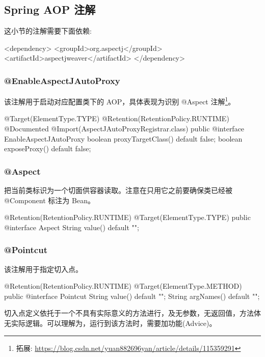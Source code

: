 \subsection{Spring AOP 注解}

这小节的注解需要下面依赖:

\begin{xml}
<dependency>
    <groupId>org.aspectj</groupId>
    <artifactId>aspectjweaver</artifactId>
</dependency>
\end{xml}

\subsubsection{@EnableAspectJAutoProxy}

该注解用于启动对应配置类下的 AOP，具体表现为识别 @Aspect 注解\footnote{拓展: \url{https://blog.csdn.net/yuan882696yan/article/details/115359291}}。

\begin{Java}
@Target(ElementType.TYPE)
@Retention(RetentionPolicy.RUNTIME)
@Documented
@Import(AspectJAutoProxyRegistrar.class)
public @interface EnableAspectJAutoProxy {
    boolean proxyTargetClass() default false;
    boolean exposeProxy() default false;
}    
\end{Java}

\subsubsection{@Aspect}

把当前类标识为一个切面供容器读取。注意在只用它之前要确保类已经被 @Component 标注为 Bean。

\begin{Java}
@Retention(RetentionPolicy.RUNTIME)
@Target(ElementType.TYPE)
public @interface Aspect {
    String value() default "";
}
\end{Java}

\subsubsection{@Pointcut}

该注解用于指定切入点。

\begin{Java}
@Retention(RetentionPolicy.RUNTIME)
@Target(ElementType.METHOD)
public @interface Pointcut {
    String value() default "";
    String argNames() default "";
}
\end{Java}

切入点定义依托于一个不具有实际意义的方法进行，及无参数，无返回值，方法体无实际逻辑。可以理解为，运行到该方法时，需要加功能(Advice)。


